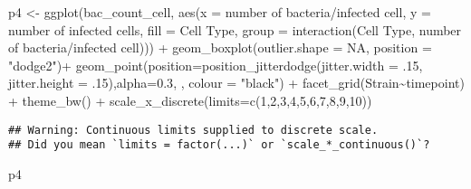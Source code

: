 \documentclass[
]{article}
\newenvironment{Shaded}{\begin{snugshade}}{\end{snugshade}}
\newcommand{\AttributeTok}[1]{\textcolor[rgb]{0.77,0.63,0.00}{#1}}
\newcommand{\ConstantTok}[1]{\textcolor[rgb]{0.00,0.00,0.00}{#1}}
\newcommand{\DecValTok}[1]{\textcolor[rgb]{0.00,0.00,0.81}{#1}}
\newcommand{\FloatTok}[1]{\textcolor[rgb]{0.00,0.00,0.81}{#1}}
\newcommand{\FunctionTok}[1]{\textcolor[rgb]{0.00,0.00,0.00}{#1}}
\newcommand{\NormalTok}[1]{#1}
\newcommand{\OtherTok}[1]{\textcolor[rgb]{0.56,0.35,0.01}{#1}}
\newcommand{\SpecialCharTok}[1]{\textcolor[rgb]{0.00,0.00,0.00}{#1}}
\newcommand{\StringTok}[1]{\textcolor[rgb]{0.31,0.60,0.02}{#1}}
\begin{document}
\begin{Shaded}
\begin{Highlighting}[]
\NormalTok{p4 }\OtherTok{\textless{}{-}} \FunctionTok{ggplot}\NormalTok{(bac\_count\_cell, }\FunctionTok{aes}\NormalTok{(}\AttributeTok{x =} \StringTok{\textasciigrave{}}\AttributeTok{number of bacteria/infected cell}\StringTok{\textasciigrave{}}\NormalTok{, }\AttributeTok{y =} \StringTok{\textasciigrave{}}\AttributeTok{number of infected cells}\StringTok{\textasciigrave{}}\NormalTok{, }\AttributeTok{fill =} \StringTok{\textasciigrave{}}\AttributeTok{Cell Type}\StringTok{\textasciigrave{}}\NormalTok{,}
                           \AttributeTok{group =}  \FunctionTok{interaction}\NormalTok{(}\StringTok{\textasciigrave{}}\AttributeTok{Cell Type}\StringTok{\textasciigrave{}}\NormalTok{, }\StringTok{\textasciigrave{}}\AttributeTok{number of bacteria/infected cell}\StringTok{\textasciigrave{}}\NormalTok{))) }\SpecialCharTok{+}
  \FunctionTok{geom\_boxplot}\NormalTok{(}\AttributeTok{outlier.shape =} \ConstantTok{NA}\NormalTok{, }\AttributeTok{position =} \StringTok{"dodge2"}\NormalTok{)}\SpecialCharTok{+}
  \FunctionTok{geom\_point}\NormalTok{(}\AttributeTok{position=}\FunctionTok{position\_jitterdodge}\NormalTok{(}\AttributeTok{jitter.width =}\NormalTok{ .}\DecValTok{15}\NormalTok{, }\AttributeTok{jitter.height =}\NormalTok{ .}\DecValTok{15}\NormalTok{),}\AttributeTok{alpha=}\FloatTok{0.3}\NormalTok{, , }\AttributeTok{colour =} \StringTok{"black"}\NormalTok{) }\SpecialCharTok{+}
  \FunctionTok{facet\_grid}\NormalTok{(Strain}\SpecialCharTok{\textasciitilde{}}\NormalTok{timepoint) }\SpecialCharTok{+}
  \FunctionTok{theme\_bw}\NormalTok{() }\SpecialCharTok{+}
  \FunctionTok{scale\_x\_discrete}\NormalTok{(}\AttributeTok{limits=}\FunctionTok{c}\NormalTok{(}\DecValTok{1}\NormalTok{,}\DecValTok{2}\NormalTok{,}\DecValTok{3}\NormalTok{,}\DecValTok{4}\NormalTok{,}\DecValTok{5}\NormalTok{,}\DecValTok{6}\NormalTok{,}\DecValTok{7}\NormalTok{,}\DecValTok{8}\NormalTok{,}\DecValTok{9}\NormalTok{,}\DecValTok{10}\NormalTok{))}
\end{Highlighting}
\end{Shaded}

\begin{verbatim}
## Warning: Continuous limits supplied to discrete scale.
## Did you mean `limits = factor(...)` or `scale_*_continuous()`?
\end{verbatim}

\begin{Shaded}
\begin{Highlighting}[]
\NormalTok{p4}
\end{Highlighting}
\end{Shaded}
\end{document}
